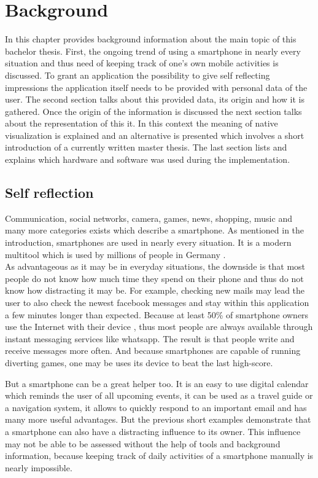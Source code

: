 \chapter{Background}
\label{cha:background}
In this chapter provides background information about the main topic of this bachelor thesis. First, the ongoing trend of using a smartphone in nearly every situation and thus need of keeping track of one's own mobile activities is discussed. To grant an application the possibility to give self reflecting impressions the application itself needs to be provided with personal data of the user. The second section talks about this provided data, its origin and how it is gathered. Once the origin of the information is discussed the next section talks about the representation of this it. In this context the meaning of native visualization is explained and an alternative is presented which involves a short introduction of a currently written master thesis. The last section lists and explains which hardware and software was used during the implementation.

\section{Self reflection}
Communication, social networks, camera, games, news, shopping, music and many more categories exists which describe a smartphone. As mentioned in the introduction, smartphones are used in nearly every situation. It is a modern multitool which is used by millions of people in Germany \cite{gstatistic}.\\
As  advantageous as it may be in everyday situations, the downside is that most people do not know how much time they spend on their phone and thus do not know how distracting it may be.
For example, checking new mails may lead the user to also check the newest facebook messages and stay within this application a few minutes longer than expected. Because at least 50\% of smartphone owners use the Internet with their device \cite{gstatistic}, thus most people are always available through instant messaging services like whatsapp. The result is that people write and receive messages more often. And because smartphones are capable of running diverting games, one may be uses its device to beat the last high-score.

But a smartphone  can be a great helper too. It is an easy to use digital calendar which reminds the user of all upcoming events, it can be used as a travel guide or a navigation system, it allows to quickly respond to an important email and has many more useful advantages. But the previous short examples demonstrate that a smartphone can also have a distracting influence to its owner. This influence may not be able to be assessed without the help of tools and background information, because keeping track of daily activities of a smartphone manually is nearly impossible.

